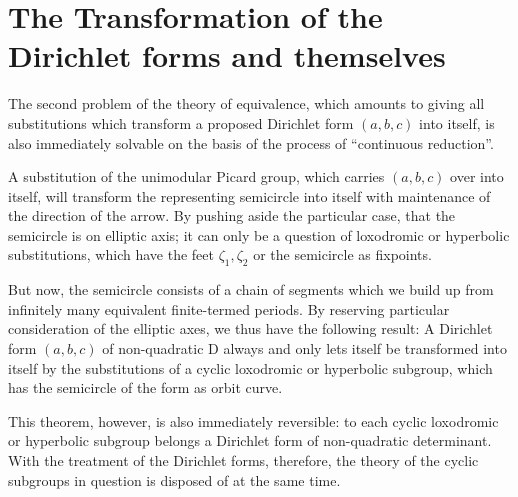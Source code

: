 \section{The Transformation of the Dirichlet forms and themselves}

The second problem of the theory of equivalence, which amounts to giving all substitutions which transform a proposed Dirichlet form $(a,b,c)$ into itself, is also immediately solvable on the basis of the process of “continuous reduction”.

A substitution of the unimodular Picard group, which carries $(a,b,c)$ over into itself, will transform the representing semicircle into itself with maintenance of the direction of the arrow. By pushing aside the particular case, that the semicircle is on elliptic axis; it can only be a question of loxodromic or hyperbolic substitutions, which have the feet $\zeta_1, \zeta_2$ or the semicircle as fixpoints.

But now, the semicircle consists of a chain of segments which we build up from infinitely many equivalent finite-termed periods. By reserving particular consideration of the elliptic axes, we thus have the following result: A Dirichlet form $(a,b,c)$ of non-quadratic D always and only lets itself be transformed into itself by the substitutions of a cyclic loxodromic or hyperbolic subgroup, which has the semicircle of the form as orbit curve.

This theorem, however, is also immediately reversible: to each cyclic loxodromic or hyperbolic subgroup belongs a Dirichlet form of non-quadratic determinant. With the treatment of the Dirichlet forms, therefore, the theory of the cyclic subgroups in question is disposed of at the same time.

